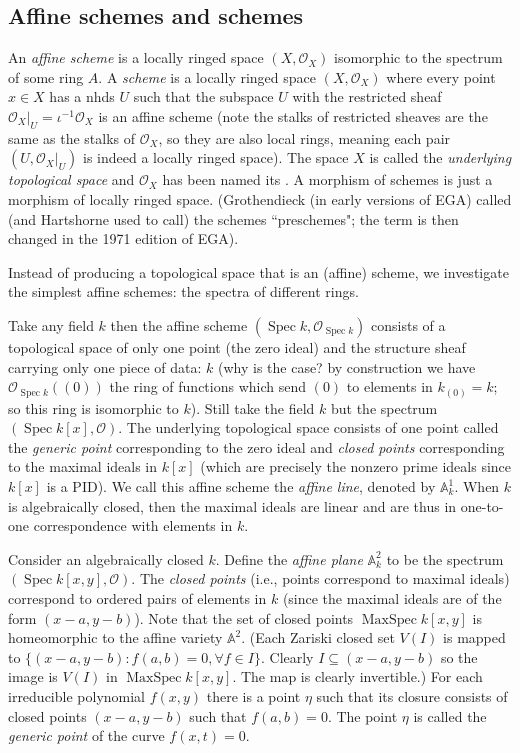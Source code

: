 \documentclass[12pt,letter]{article}
\newcommand{\Spec}[0]{\operatorname{Spec}}
\newcommand{\MaxSpec}[0]{\operatorname{MaxSpec}}
\begin{document}
	\subsection{Affine schemes and schemes}\label{ssec-scheme}
	An \textit{affine scheme} is a locally ringed space $(X,\mathscr O_X)$ isomorphic to the spectrum of some ring $A$. A \textit{scheme} is a locally ringed space $(X,\mathscr O_X)$ where every point $x\in X$ has a nhds $U$ such that the subspace $U$ with the restricted sheaf $\mathscr O_X|_U=\iota^{-1}\mathscr O_X$ is an affine scheme (note the stalks of restricted sheaves are the same as the stalks of $\mathscr O_X$, so they are also local rings, meaning each pair $(U, \mathscr O_X|_U)$ is indeed a locally ringed space). The space $X$ is called the \textit{underlying topological space} and $\mathscr O_X$ has been named its . A morphism of schemes is just a morphism of locally ringed space. (Grothendieck (in early versions of EGA) called (and Hartshorne used to call) the schemes ``preschemes"; the term is then changed in the 1971 edition of EGA).
	
	Instead of producing a topological space that is an (affine) scheme, we investigate the simplest  affine schemes: the spectra of different rings. 
	
	Take any field $k$ then the affine scheme $(\Spec k, \mathscr O_{\Spec k})$ consists of a topological space of only one point (the zero ideal) and the structure sheaf carrying only one piece of data: $k$ (why is the case? by construction we have $\mathscr O_{\Spec k}((0))$ the ring of functions which send $(0)$ to elements in $k_{(0)}=k$; so this ring is isomorphic to $k$). Still take the field $k$ but the spectrum $(\Spec k[x], \mathscr O)$. The underlying topological space consists of one point called the \textit{generic point} corresponding to the zero ideal and \textit{closed points} corresponding to the maximal ideals in $k[x]$ (which are precisely the nonzero prime ideals since $k[x]$ is a PID). We call this affine scheme the \textit{affine line}, denoted by $\mathbb A_k^1$. When $k$ is algebraically closed, then the maximal ideals are linear and are thus in one-to-one correspondence with elements in $k$.
	
	Consider an algebraically closed $k$. Define the \textit{affine plane} $\mathbb A^2_k$ to be the spectrum $(\Spec k[x, y], \mathscr O)$. The \textit{closed points} (i.e., points correspond to maximal ideals) correspond to ordered pairs of elements in $k$ (since the maximal ideals are of the form $(x-a, y-b)$). Note that the set of closed points $\MaxSpec k[x, y]$ is homeomorphic to the affine variety $\mathbb A^2$. (Each Zariski closed set $V(I)$ is mapped to $\{(x-a, y-b):f(a, b)=0,\forall f\in I\}$. Clearly $I\subseteq (x-a, y-b)$ so the image is $V(I)$ in $\MaxSpec k[x, y]$. The map is clearly invertible.) For each irreducible polynomial $f(x, y)$ there is a point $\eta$ such that its closure consists of closed points $(x-a, y-b)$ such that $f(a, b)=0$. The point $\eta$ is called the \textit{generic point} of the curve $f(x, t)=0$.
	
\end{document}
